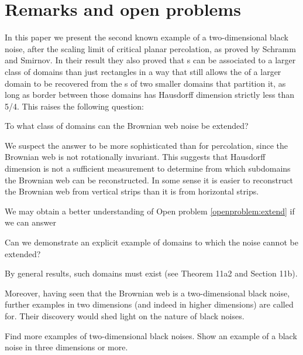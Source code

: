 {
\section{Remarks and open problems}

\label{sec:open-problems}

In this paper we present the second known example of a two-dimensional
black noise, after the scaling limit of critical planar percolation,
as proved by Schramm and Smirnov.  In their result they also proved
that \sigfield{}s can be associated to a larger class of domains than
just rectangles in a way that still allows the \sigfield{} of a larger
domain to be recovered from the \sigfield{}s of two smaller domains
that partition it, as long as border between those domains has
Hausdorff dimension strictly less than 5/4.
This raises the following question:

\begin{openproblem}
  \label{openproblem:extend}
  To what class of domains can the Brownian web noise be extended?
\end{openproblem}

We suspect the answer to be more sophisticated than for percolation,
since the Brownian web is not rotationally invariant.  
This suggests that Hausdorff dimension is not a sufficient measurement
to determine from which subdomains the Brownian web can be
reconstructed.  In some sense it is easier to reconstruct the Brownian
web from vertical strips than it is from horizontal strips.

We may obtain a better understanding of Open problem
\ref{openproblem:extend} if we can answer

\begin{openproblem}
  Can we demonstrate an explicit example of domains to which the noise
  cannot be extended?
\end{openproblem}

By general results, such domains must exist (see
\cite{tsirelson-nonclassical-stochastic-flows} Theorem 11a2 and
Section 11b).

Moreover, having seen that the Brownian web is a two-dimensional black
noise, further examples in two dimensions (and indeed in higher
dimensions) are called for.  Their
discovery would shed light on the nature of black noises.

\begin{openproblem}
  Find more examples of two-dimensional black noises.  Show an example
  of a black noise in three dimensions or more.
\end{openproblem}
}
